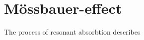 
\section{Mössbauer-effect}
\label{sec:mössbauer-effect}

The process of resonant absorbtion describes 
